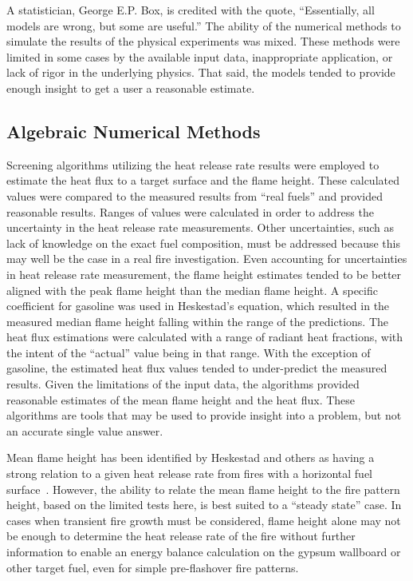 \documentclass[twoside]{uocthesis}
\begin{document}
{A statistician, George E.P. Box, is credited with the quote, ``Essentially, all models are wrong, but some are useful.''  The ability of the numerical methods to simulate the results of the physical experiments was mixed.  These methods were limited in some cases by the available input data, inappropriate application, or lack of rigor in the underlying physics.  That said, the models tended to provide enough insight to get a user a reasonable estimate.     

\subsection{Algebraic Numerical Methods}

Screening algorithms utilizing the heat release rate results were employed to estimate the heat flux to a target surface and the flame height.  These calculated values were compared to the measured results from “real fuels” and provided reasonable results.  Ranges of values were calculated in order to address the uncertainty in the heat release rate measurements.  Other uncertainties, such as lack of knowledge on the exact fuel composition, must be addressed because this may well be the case in a real fire investigation.  Even accounting for uncertainties in heat release rate measurement, the flame height estimates tended to be better aligned with the peak flame height than the median flame height.  A specific coefficient for gasoline was used in Heskestad's equation, which resulted in the measured median flame height falling within the range of the predictions.  The heat flux estimations were calculated with a range of radiant heat fractions, with the intent of the “actual” value being in that range.  With the exception of gasoline, the estimated heat flux values tended to under-predict the measured results.  Given the limitations of the input data, the algorithms provided reasonable estimates of the mean flame height and the heat flux.  These algorithms are tools that may be used to provide insight into a problem, but not an accurate single value answer.

Mean flame height has been identified by Heskestad and others as having a strong relation to a given heat release rate from fires with a horizontal fuel surface~\cite{Heskestad:SFPE, Beyler:1986}.  However, the ability to relate the mean flame height to the fire pattern height, based on the limited tests here, is best suited to a “steady state” case.  In cases when transient fire growth must be considered, flame height alone may not be enough to determine the heat release rate of the fire without further information to enable an energy balance calculation on the gypsum wallboard or other target fuel, even for simple pre-flashover fire patterns.  

}
\end{document}
